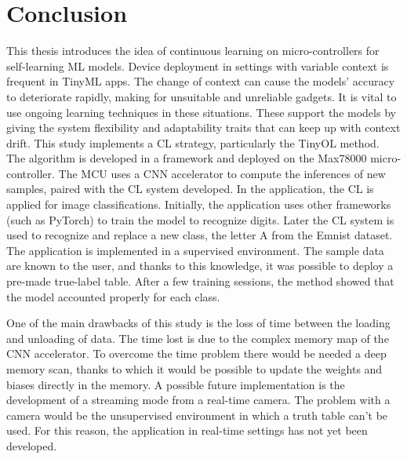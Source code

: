 \chapter{Conclusion}
\label{cha:conclusion}

\quad This thesis introduces the idea of continuous learning on micro-controllers for self-learning ML models. Device deployment in settings with variable context is frequent in TinyML apps. The change of context can cause the models' accuracy to deteriorate rapidly, making for unsuitable and unreliable gadgets. It is vital to use ongoing learning techniques in these situations. These support the models by giving the system flexibility and adaptability traits that can keep up with context drift. 
This study implements a CL strategy, particularly the TinyOL method. The algorithm is developed in a framework and deployed on the Max78000 micro-controller. The MCU uses a CNN accelerator to compute the inferences of new samples, paired with the CL system developed. 
In the application, the CL is applied for image classifications. Initially, the application uses other frameworks (such as PyTorch) to train the model to recognize digits. Later the CL system is used to recognize and replace a new class, the letter A from the Emnist dataset. 
The application is implemented in a supervised environment. The sample data are known to the user, and thanks to this knowledge, it was possible to deploy a pre-made true-label table. After a few training sessions, the method showed that the model accounted properly for each class. 
 
 \singlespacing
 
\quad One of the main drawbacks of this study is the loss of time between the loading and unloading of data. The time lost is due to the complex memory map of the CNN accelerator. To overcome the time problem there would be needed a deep memory scan, thanks to which it would be possible to update the weights and biases directly in the memory. A possible future implementation is the development of a streaming mode from a real-time camera. The problem with a camera would be the unsupervised environment in which a truth table can't be used. For this reason, the application in real-time settings has not yet been developed. 
 
\clearpage
\newpage
\mbox{~}
\clearpage
\newpage